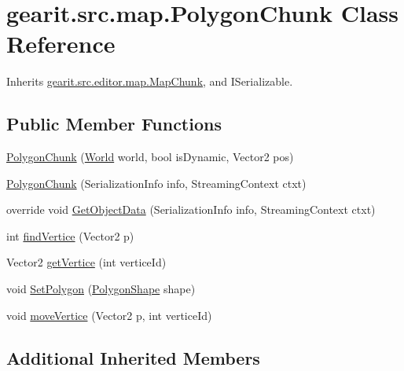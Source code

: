 \hypertarget{classgearit_1_1src_1_1map_1_1_polygon_chunk}{\section{gearit.\+src.\+map.\+Polygon\+Chunk Class Reference}
\label{classgearit_1_1src_1_1map_1_1_polygon_chunk}
}


Inherits \hyperlink{classgearit_1_1src_1_1editor_1_1map_1_1_map_chunk}{gearit.\+src.\+editor.\+map.\+Map\+Chunk}, and I\+Serializable.

\subsection*{Public Member Functions}
\begin{DoxyCompactItemize}
\item 
\hyperlink{classgearit_1_1src_1_1map_1_1_polygon_chunk_a8388bcb4c7fc4a487f981347dadb2803}{Polygon\+Chunk} (\hyperlink{class_farseer_physics_1_1_dynamics_1_1_world}{World} world, bool is\+Dynamic, Vector2 pos)
\item 
\hyperlink{classgearit_1_1src_1_1map_1_1_polygon_chunk_aaffe29eb9ac01404737406a8c4dd8c2a}{Polygon\+Chunk} (Serialization\+Info info, Streaming\+Context ctxt)
\item 
override void \hyperlink{classgearit_1_1src_1_1map_1_1_polygon_chunk_a7f7008b23d1450a9b6b677f37c365106}{Get\+Object\+Data} (Serialization\+Info info, Streaming\+Context ctxt)
\item 
int \hyperlink{classgearit_1_1src_1_1map_1_1_polygon_chunk_af7c06b494de14987f14191358d9d1dc6}{find\+Vertice} (Vector2 p)
\item 
Vector2 \hyperlink{classgearit_1_1src_1_1map_1_1_polygon_chunk_a30ddeb22024d795c8fefc49d0d8d5823}{get\+Vertice} (int vertice\+Id)
\item 
void \hyperlink{classgearit_1_1src_1_1map_1_1_polygon_chunk_a8cc70ce1567b52d636aea2f14f6ebc97}{Set\+Polygon} (\hyperlink{class_farseer_physics_1_1_collision_1_1_shapes_1_1_polygon_shape}{Polygon\+Shape} shape)
\item 
void \hyperlink{classgearit_1_1src_1_1map_1_1_polygon_chunk_ace6d0e104444a8a9a9a8c7522c74eff9}{move\+Vertice} (Vector2 p, int vertice\+Id)
\end{DoxyCompactItemize}
\subsection*{Additional Inherited Members}


